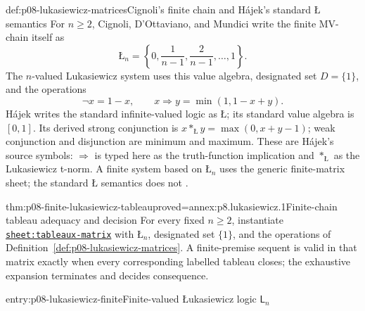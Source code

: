 \begin{hbdefinition}{def:p08-lukasiewicz-matrices}{Cignoli's finite chain and H\'ajek's standard \(\text{\L}\) semantics}
For \(n\geq2\), Cignoli, D'Ottaviano, and Mundici write the finite
MV-chain itself as
\[
 \text{\L}_n=\left\{0,\frac1{n-1},\frac2{n-1},\ldots,1\right\}.
\]
The \(n\)-valued Lukasiewicz system uses this value algebra, designated set
\(D=\{1\}\), and the operations
\[
  \neg x=1-x,
  \qquad
  x\Rightarrow y=\min(1,1-x+y).
\]
H\'ajek writes the standard infinite-valued logic as \(\text{\L}\); its
standard value algebra is \([0,1]\).  Its derived strong conjunction is
\(x\mathbin{\ast_{\text{\L}}}y=\max(0,x+y-1)\); weak conjunction and
disjunction are minimum and maximum.  These are H\'ajek's source symbols:
\(\Rightarrow\) is typed here as the truth-function implication and
\(\ast_{\text{\L}}\) as the Lukasiewicz t-norm.  A finite system based on
\(\text{\L}_n\) uses
the generic finite-matrix sheet; the standard \(\text{\L}\) semantics does not
\cite{Lukasiewicz1920,LukasiewiczTarski1930,Hajek1998,
  CignoliDOttavianoMundici2000}.
\end{hbdefinition}

\begin{hblemma}{thm:p08-finite-lukasiewicz-tableau}{proved=annex:p8.lukasiewicz.1}{Finite-chain tableau adequacy and decision}
For every fixed \(n\geq2\), instantiate
\hyperref[sheet:tableaux-matrix]{\texttt{sheet:tableaux-matrix}} with
\(\text{\L}_n\), designated set \(\{1\}\), and the operations of
Definition~\ref{def:p08-lukasiewicz-matrices}.  A finite-premise sequent is
valid in that matrix exactly when every corresponding labelled tableau closes;
the exhaustive expansion terminates and decides consequence.
\end{hblemma}

\begin{systementry}{entry:p08-lukasiewicz-finite}{Finite-valued \L{}ukasiewicz logic \(\mathsf L_n\)}
\end{systementry}

